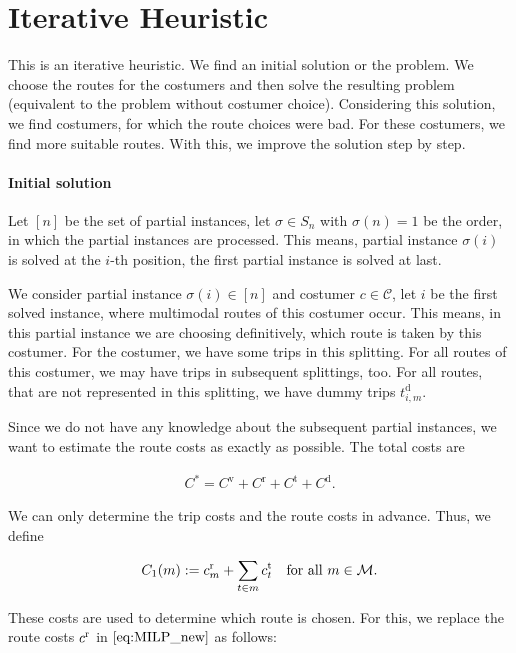 \section{Iterative Heuristic}

This is an iterative heuristic. We find an initial solution or the problem. We choose the routes for the costumers and then solve the resulting problem (equivalent to the problem without costumer choice). Considering this solution, we find costumers, for which the route choices were bad. For these costumers, we find more suitable routes. With this, we improve the solution step by step.

\paragraph{Initial solution} \parfill

Let $[n]$ be the set of partial instances, let $\sigma\in S_n$ with $\sigma(n)=1$ be the order, in which the partial instances are processed. This means, partial instance $\sigma(i)$ is solved at the $i$-th position, the first partial instance is solved at last.

We consider partial instance $\sigma(i)\in [n]$ and costumer $c\in\mathcal{C}$, let $i$ be the first solved instance, where multimodal routes of this costumer occur. This means, in this partial instance we are choosing definitively, which route is taken by this costumer. For the costumer, we have some trips in this splitting. For all routes of this costumer, we may have trips in subsequent splittings, too. For all routes, that are not represented in this splitting, we have dummy trips $t^{\operatorname{d}}_{i,m}$.

Since we do not have any knowledge about the subsequent partial instances, we want to estimate the route costs as exactly as possible. The total costs are

\begin{align}
	C^* = C^{\operatorname{v}} + C^{\operatorname{r}} + C^{\operatorname{t}} + C^{\operatorname{d}}.
\end{align}

We can only determine the trip costs and the route costs in advance. Thus, we define

\begin{align}
	C_1(m) := c^{\operatorname{r}}_m + \sum_{t\in m}c^{\operatorname{t}}_t & & \text{for all } m\in\mathcal{M}.
\end{align}

These costs are used to determine which route is chosen. For this, we replace the route costs $c^{\operatorname{r}}$ in $\eqref{eq:MILP_new}$ as follows:

